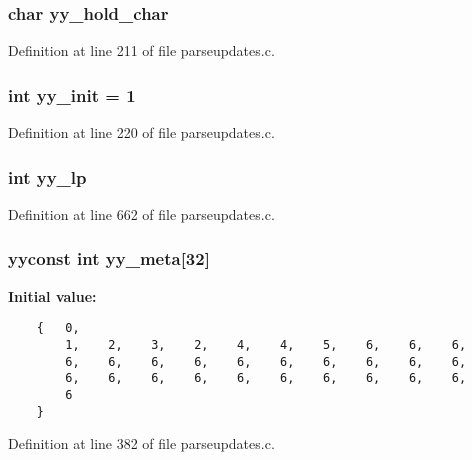 \subsubsection{\setlength{\rightskip}{0pt plus 5cm}char {\bf yy\_\-hold\_\-char}\hspace{0.3cm}{\tt  [static]}}\label{parseupdates_8c_a66}




Definition at line 211 of file parseupdates.c.
\subsubsection{\setlength{\rightskip}{0pt plus 5cm}int {\bf yy\_\-init} = 1\hspace{0.3cm}{\tt  [static]}}\label{parseupdates_8c_a69}




Definition at line 220 of file parseupdates.c.
\subsubsection{\setlength{\rightskip}{0pt plus 5cm}int {\bf yy\_\-lp}\hspace{0.3cm}{\tt  [static]}}\label{parseupdates_8c_a87}




Definition at line 662 of file parseupdates.c.
\subsubsection{\setlength{\rightskip}{0pt plus 5cm}yyconst int {\bf yy\_\-meta}[32]\hspace{0.3cm}{\tt  [static]}}\label{parseupdates_8c_a79}


{\bf Initial value:}

\footnotesize\begin{verbatim}
    {   0,
        1,    2,    3,    2,    4,    4,    5,    6,    6,    6,
        6,    6,    6,    6,    6,    6,    6,    6,    6,    6,
        6,    6,    6,    6,    6,    6,    6,    6,    6,    6,
        6
    }
\end{verbatim}\normalsize 


Definition at line 382 of file parseupdates.c.
